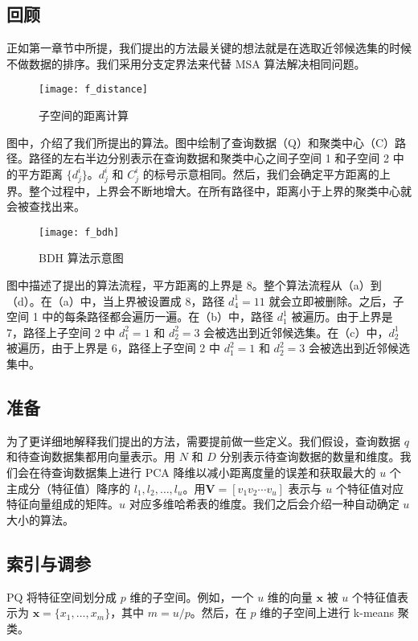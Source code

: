 \subsection{回顾}
正如第一章节中所提，我们提出的方法最关键的想法就是在选取近邻候选集的时候不做数据的排序。我们采用分支定界法来代替 MSA 算法解决相同问题。
\begin{figure}[H]
  \centering
  \texttt{[image: f\_distance]}
  \caption*{子空间的距离计算}
  \label{fig:f_distance}
\end{figure}
图中，介绍了我们所提出的算法。图中绘制了查询数据（Q）和聚类中心（C）路径。路径的左右半边分别表示在查询数据和聚类中心之间子空间 1 和子空间 2 中的平方距离 $\{d^i_j\}$。$d^i_j$ 和 $C^i_j$ 的标号示意相同。然后，我们会确定平方距离的上界。整个过程中，上界会不断地增大。在所有路径中，距离小于上界的聚类中心就会被查找出来。
\begin{figure}[H]
  \centering
  \texttt{[image: f\_bdh]}
  \caption*{BDH 算法示意图}
  \label{fig:f_bdh}
\end{figure}
图中描述了提出的算法流程，平方距离的上界是 8。整个算法流程从（a）到（d）。在（a）中，当上界被设置成 8，路径 $d^1_4 =11$ 就会立即被删除。之后，子空间 1 中的每条路径都会遍历一遍。在（b）中，路径 $d^1_1$ 被遍历。由于上界是 7，路径上子空间 2 中 $d^2_1 =1$ 和 $d_2^2=3$ 会被选出到近邻候选集。在（c）中，$d^1_2$ 被遍历，由于上界是 6，路径上子空间 2 中 $d^2_1 =1$ 和 $d_2^2=3$ 会被选出到近邻候选集中。
\subsection{准备}
为了更详细地解释我们提出的方法，需要提前做一些定义。我们假设，查询数据 $q$ 和待查询数据集都用向量表示。用 $N$ 和 $D$ 分别表示待查询数据的数量和维度。我们会在待查询数据集上进行 PCA 降维以减小距离度量的误差和获取最大的 $u$ 个主成分（特征值）降序的 $l_1,l_2,\ldots,l_u$。用$\mathbf{V}=[v_1 v_2 \cdots v_u]$ 表示与 $u$ 个特征值对应特征向量组成的矩阵。$u$ 对应多维哈希表的维度。我们之后会介绍一种自动确定 $u$ 大小的算法。
\subsection{索引与调参}
PQ 将特征空间划分成 $p$ 维的子空间。例如，一个 $u$ 维的向量 $\mathbf{x}$ 被 $u$ 个特征值表示为 $\mathbf{x} = \{x_1,\ldots,x_m\}$，其中 $m = u/p$。然后，在 $p$ 维的子空间上进行 k-means 聚类。

